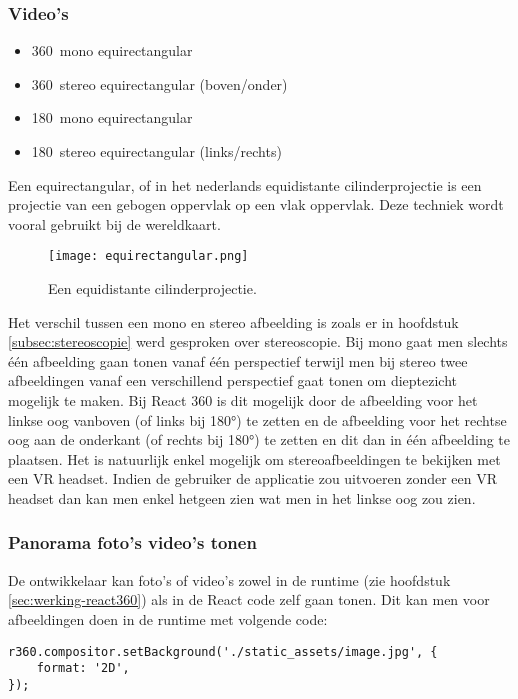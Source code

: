 \subsubsection{Video's}
\begin{itemize}
	\item 360\textdegree\ mono equirectangular
	\item 360\textdegree\ stereo equirectangular (boven/onder)
	\item 180\textdegree\ mono equirectangular
	\item 180\textdegree\ stereo equirectangular (links/rechts)
\end{itemize}

Een equirectangular, of in het nederlands equidistante cilinderprojectie is een projectie van een gebogen oppervlak op een vlak oppervlak. Deze techniek wordt vooral gebruikt bij de wereldkaart.

\begin{figure}
	\centering
	\texttt{[image: equirectangular.png]}
	\caption{Een equidistante cilinderprojectie.}
	\label{fig:eq-cilinder}
\end{figure}

Het verschil tussen een mono en stereo afbeelding is zoals er in hoofdstuk \ref{subsec:stereoscopie} werd gesproken over stereoscopie. Bij mono gaat men slechts één afbeelding gaan tonen vanaf één perspectief terwijl men bij stereo twee afbeeldingen vanaf een verschillend perspectief gaat tonen om dieptezicht mogelijk te maken. Bij React 360 is dit mogelijk door de afbeelding voor het linkse oog vanboven (of links bij 180°) te zetten en de afbeelding voor het rechtse oog aan de onderkant (of rechts bij 180°) te zetten en dit dan in één afbeelding te plaatsen. Het is natuurlijk enkel mogelijk om stereoafbeeldingen te bekijken met een VR headset. Indien de gebruiker de applicatie zou uitvoeren zonder een VR headset dan kan men enkel hetgeen zien wat men in het linkse oog zou zien.

\subsubsection{Panorama foto's video's tonen}
De ontwikkelaar kan foto's of video's zowel in de runtime (zie hoofdstuk \ref{sec:werking-react360}) als in de React code zelf gaan tonen. Dit kan men voor afbeeldingen doen in de runtime met volgende code:

\begin{lstlisting}[frame=single, caption=Een afbeelding als achtergrond instellen in de runtime.]
r360.compositor.setBackground('./static_assets/image.jpg', {
	format: '2D',
});
\end{lstlisting}

